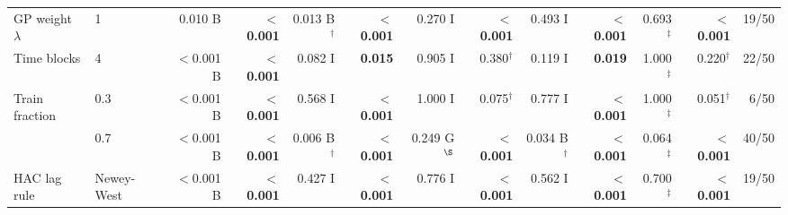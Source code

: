 \begin{tabular}{llrrrrrrrrrrr}
GP weight $\lambda$ & 1 & 0.010 B & \textbf{$<$0.001} & 0.013 B$^\dagger$ & \textbf{$<$0.001} & 0.270 I & \textbf{$<$0.001} & 0.493 I & \textbf{$<$0.001} & 0.693$^\ddagger$ & \textbf{$<$0.001} & 19/50 \\
Time blocks & 4 & $<$0.001 B & \textbf{$<$0.001} & 0.082 I & \textbf{0.015} & 0.905 I & 0.380$^\dagger$ & 0.119 I & \textbf{0.019} & 1.000$^\ddagger$ & 0.220$^\dagger$ & 22/50 \\
Train fraction & 0.3 & $<$0.001 B & \textbf{$<$0.001} & 0.568 I & \textbf{$<$0.001} & 1.000 I & 0.075$^\dagger$ & 0.777 I & \textbf{$<$0.001} & 1.000$^\ddagger$ & 0.051$^\dagger$ & 6/50 \\
 & 0.7 & $<$0.001 B & \textbf{$<$0.001} & 0.006 B$^\dagger$ & \textbf{$<$0.001} & 0.249 G$^\S$ & \textbf{$<$0.001} & 0.034 B$^\dagger$ & \textbf{$<$0.001} & 0.064$^\ddagger$ & \textbf{$<$0.001} & 40/50 \\
HAC lag rule & Newey-West & $<$0.001 B & \textbf{$<$0.001} & 0.427 I & \textbf{$<$0.001} & 0.776 I & \textbf{$<$0.001} & 0.562 I & \textbf{$<$0.001} & 0.700$^\ddagger$ & \textbf{$<$0.001} & 19/50 \\
\bottomrule
\end{tabular}
